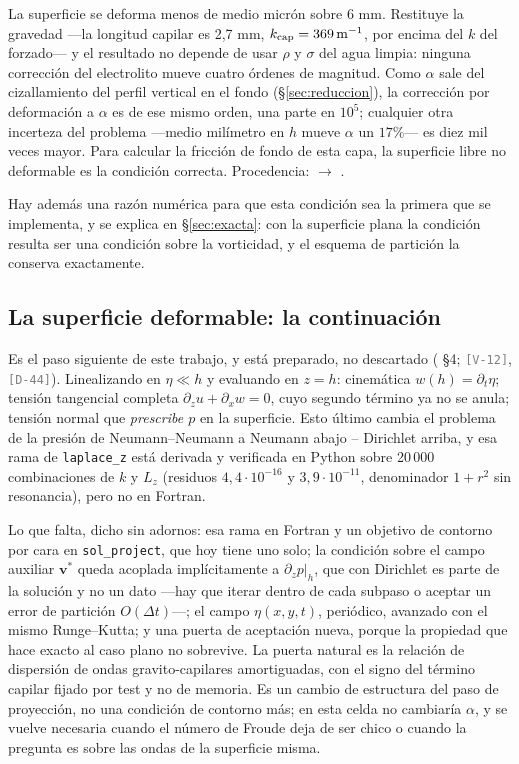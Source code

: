 \documentclass[11pt,a4paper]{article}
\newcommand{\etq}[1]{\textcolor{gray}{\texttt{[#1]}}}
\begin{document}
La superficie se deforma menos de medio micrón sobre 6 mm. Restituye la gravedad
---la longitud capilar es 2,7 mm, $k_{\rm cap}=369\,\mathrm{m^{-1}}$, por encima del $k$
del forzado--- y el resultado no depende de usar $\rho$ y $\sigma$ del agua limpia:
ninguna corrección del electrolito mueve cuatro órdenes de magnitud. Como $\alpha$ sale
del cizallamiento del perfil vertical en el fondo (§\ref{sec:reduccion}), la corrección
por deformación a $\alpha$ es de ese mismo orden, una parte en $10^5$; cualquier otra
incerteza del problema ---medio milímetro en $h$ mueve $\alpha$ un $17\%$--- es diez mil
veces mayor. Para calcular la fricción de fondo de esta capa, la superficie libre no
deformable es la condición correcta. Procedencia:
 $\to$
.

Hay además una razón numérica para que esta condición sea la primera que se implementa,
y se explica en §\ref{sec:exacta}: con la superficie plana la condición resulta ser una
condición sobre la vorticidad, y el esquema de partición la conserva exactamente.

\subsection{La superficie deformable: la continuación}
\label{sec:deformable}

Es el paso siguiente de este trabajo, y está preparado, no descartado
( §4; \etq{V-12}, \etq{D-44}).
Linealizando en $\eta\ll h$ y evaluando en $z=h$: cinemática $w(h)=\partial_t\eta$; tensión
tangencial completa $\partial_z u+\partial_x w=0$, cuyo segundo término ya no se anula;
tensión normal que \emph{prescribe $p$} en la superficie. Esto último cambia el problema de
la presión de Neumann--Neumann a Neumann abajo -- Dirichlet arriba, y esa rama de
\texttt{laplace\_z} está derivada y verificada en Python sobre 20\,000 combinaciones de
$k$ y $L_z$ (residuos $4{,}4\cdot10^{-16}$ y $3{,}9\cdot10^{-11}$, denominador $1+r^2$ sin
resonancia), pero no en Fortran.

Lo que falta, dicho sin adornos: esa rama en Fortran y un objetivo de contorno por cara
en \texttt{sol\_project}, que hoy tiene uno solo; la condición sobre el campo auxiliar
$\boldsymbol v^*$ queda acoplada implícitamente a $\partial_z p|_h$, que con Dirichlet es
parte de la solución y no un dato ---hay que iterar dentro de cada subpaso o aceptar un
error de partición $O(\Delta t)$---; el campo $\eta(x,y,t)$, periódico, avanzado con el
mismo Runge--Kutta; y una puerta de aceptación nueva, porque la propiedad que hace exacto
al caso plano no sobrevive. La puerta natural es la relación de dispersión de ondas
gravito-capilares amortiguadas, con el signo del término capilar fijado por test y no de
memoria. Es un cambio de estructura del paso de proyección, no una condición de contorno
más; en esta celda no cambiaría $\alpha$, y se vuelve necesaria cuando el número de
Froude deja de ser chico o cuando la pregunta es sobre las ondas de la superficie misma.
\end{document}
